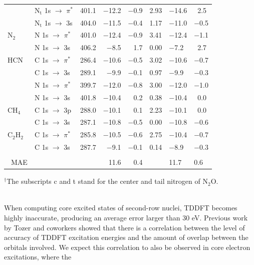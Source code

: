 \documentclass[12pt]{article}
\begin{document}
\begin{table}[!ht]
\begin{center}
\begin{tabular*}{12.5cm}{@{\extracolsep{\fill} }llcrrcHH}
    ~         & N$_\text{t}$ 1s $\rightarrow$ $\pi^*$ & 401.1 & $-$12.2     & $-$0.9 & 2.93 & $-$14.6    & \ 2.5   \\
    ~         & N$_\text{t}$ 1s $\rightarrow$ 3s      & 404.0   & $-$11.5    & $-$0.4 & 1.17   & $-$11.0    & $-$0.5  \\
    N$_2$         &N 1s  $\rightarrow$ $\pi^*$ & 401.0 & $-$12.4 & $-$0.9 & 3.41 & $-$12.4 & $-$1.1 \\
    ~         & N 1s  $\rightarrow$ 3s & 406.2 & $-$8.5 & 1.7 & 0.00  & $-$7.2 & \ 2.7\\ 
    HCN       & C 1s $\rightarrow$ $\pi^*$     & 286.4 & $-$10.6     & $-$0.5 & 3.02  & $-$10.6    & $-$0.7  \\
    ~         & C 1s $\rightarrow$ 3s          & 289.1 & $-$9.9      & $-$0.1 & 0.97   & $-$9.9    & $-$0.3  \\
    ~         & N 1s $\rightarrow$  $\pi^*$    & 399.7 & $-$12.0     & $-$0.8 & 3.00  & $-$12.0    & $-$1.0  \\
    ~         & N 1s $\rightarrow$ 3s          & 401.8 & $-$10.4      & \ 0.2 & 0.38    & $-$10.4    & \ 0.0  \\
    CH$_4$      & C 1s $\rightarrow$ 3p          & 288.0   & $-$10.1      & \ 0.1 & 2.23   & $-$10.1    & \ 0.0   \\
    ~         & C 1s $\rightarrow$ 3s          & 287.1 & $-$10.8    & $-$0.5 & 0.00   & $-$10.8     & $-$0.6 \\ 
        C$_2$H$_2$      & C 1s $\rightarrow$ $\pi^*$           & 285.8   & $-$10.5      & $-$0.6 & 2.75   & $-$10.4   & $-$0.7  \\
    ~         & C 1s $\rightarrow$ 3s            & 287.7 & $-$9.1 & $-$0.1 & 0.14   & $-$8.9    & $-$0.3\\\\
    ~MAE         &                            & ~     & 11.6      & 0.4 &   & 11.7     & 0.6 \\ 
    \hline
    \hline
    \end{tabular*}
    
    $^{\dagger}$The subscripts c and t stand for the center and tail nitrogen of N$_2$O.
\end{center}
     \label{table:FirstRow}
     \end{table}
     \\
When computing core excited states of second-row nuclei, TDDFT becomes highly inaccurate, producing an average error larger than 30 eV. Previous work by Tozer and coworkers \cite{peach_excitation_2008}  showed that there is a correlation between the level of accuracy of TDDFT excitation energies and the amount of overlap between the orbitals involved. We expect this correlation to also be observed in core electron excitations, where the
\end{document}
